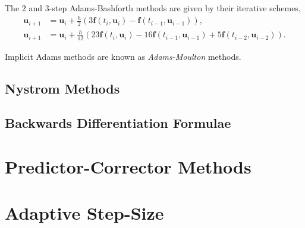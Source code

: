\documentclass[12pt, twoside]{report}
\theoremstyle{plain}
\theoremstyle{definition}
\theoremstyle{definition}
\begin{document}
            The $2$ and $3$-step Adams-Bashforth methods are given by their 
            iterative schemes,
            \begin{align}
                \mathbf{u}_{i+1} &= \mathbf{u}_{i} + \frac{h}{2} 
                (3\mathbf{f}(t_i, \mathbf{u}_i) - 
                \mathbf{f}(t_{i-1},\mathbf{u}_{i-1})),\\
                \mathbf{u}_{i+1} &= \mathbf{u}_{i} + \frac{h}{12} 
                (23\mathbf{f}(t_i, \mathbf{u}_i) - 
                16\mathbf{f}(t_{i-1},\mathbf{u}_{i-1}) + 
                5\mathbf{f}(t_{i-2}, \mathbf{u}_{i-2})).
            \end{align}

            Implicit Adams methods are known as \textit{Adams-Moulton} 
            methods. 


        \subsection{Nystrom Methods}
        \label{2_nystrom}

        \subsection{Backwards Differentiation Formulae}
        \label{2_bdf}


    \section{Predictor-Corrector Methods}
    \label{2_predictor_correctors}


    \section{Adaptive Step-Size}
    \label{2_adaptive}
\end{document}
